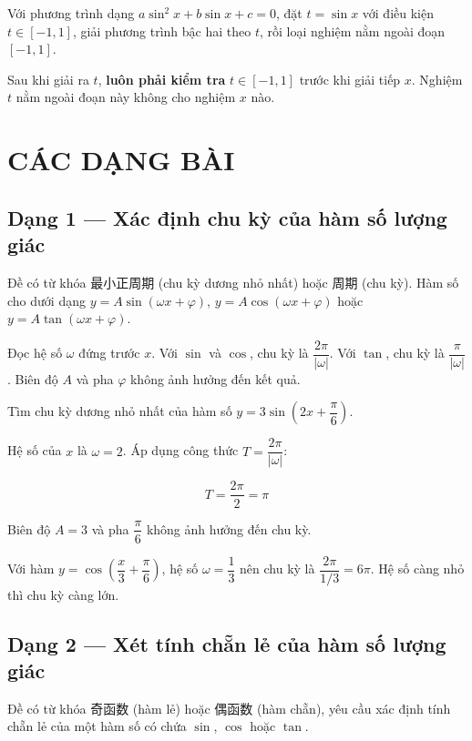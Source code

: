 \documentclass[11pt, a4paper]{article}
\begin{document}
\begin{dinhly}
Với phương trình dạng $a\sin^2 x + b\sin x + c = 0$, đặt $t = \sin x$ với điều kiện $t \in [-1, 1]$, giải phương trình bậc hai theo $t$, rồi loại nghiệm nằm ngoài đoạn $[-1, 1]$.

 Sau khi giải ra $t$, \textbf{luôn phải kiểm tra} $t \in [-1, 1]$ trước khi giải tiếp $x$. Nghiệm $t$ nằm ngoài đoạn này không cho nghiệm $x$ nào.

\end{dinhly}
\section{CÁC DẠNG BÀI}

\subsection{Dạng 1 — Xác định chu kỳ của hàm số lượng giác}

 Đề có từ khóa 最小正周期 (chu kỳ dương nhỏ nhất) hoặc 周期 (chu kỳ). Hàm số cho dưới dạng $y = A\sin(\omega x + \varphi)$, $y = A\cos(\omega x + \varphi)$ hoặc $y = A\tan(\omega x + \varphi)$.

 Đọc hệ số $\omega$ đứng trước $x$. Với $\sin$ và $\cos$, chu kỳ là $\dfrac{2\pi}{|\omega|}$. Với $\tan$, chu kỳ là $\dfrac{\pi}{|\omega|}$. Biên độ $A$ và pha $\varphi$ không ảnh hưởng đến kết quả.

\begin{vidu}[{1}]
Tìm chu kỳ dương nhỏ nhất của hàm số $y = 3\sin\left(2x + \dfrac{\pi}{6}\right)$.

Hệ số của $x$ là $\omega = 2$. Áp dụng công thức $T = \dfrac{2\pi}{|\omega|}$:

$$T = \frac{2\pi}{2} = \pi$$

Biên độ $A = 3$ và pha $\dfrac{\pi}{6}$ không ảnh hưởng đến chu kỳ.

 Với hàm $y = \cos\left(\dfrac{x}{3} + \dfrac{\pi}{6}\right)$, hệ số $\omega = \dfrac{1}{3}$ nên chu kỳ là $\dfrac{2\pi}{1/3} = 6\pi$. Hệ số càng nhỏ thì chu kỳ càng lớn.

\end{vidu}
\subsection{Dạng 2 — Xét tính chẵn lẻ của hàm số lượng giác}

 Đề có từ khóa 奇函数 (hàm lẻ) hoặc 偶函数 (hàm chẵn), yêu cầu xác định tính chẵn lẻ của một hàm số có chứa $\sin$, $\cos$ hoặc $\tan$.
\end{document}
